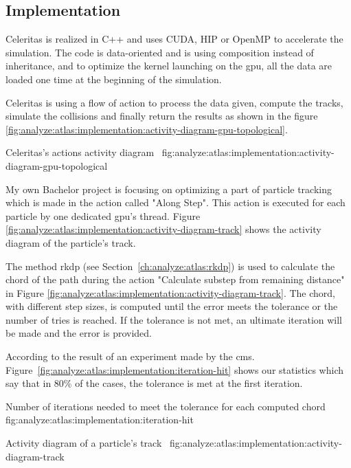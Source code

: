 \subsection{Implementation}
\label{ch:analyze:atlas:implementation}

Celeritas is realized in C++ and uses CUDA, HIP or OpenMP to accelerate the
simulation.
The code is data-oriented and is using composition instead of inheritance, and
to optimize the kernel launching on the \acrshort{gpu}, all the data are loaded
one time at the beginning of the simulation.

Celeritas is using a flow of action to process the data given, compute the
tracks, simulate the collisions and finally return the results as shown in the
figure \ref{fig:analyze:atlas:implementation:activity-diagram-gpu-topological}.

{Celeritas's actions activity diagram~\cite{chep2023-presentation-johnson}}
{fig:analyze:atlas:implementation:activity-diagram-gpu-topological}

My own Bachelor project is focusing on optimizing a part of particle tracking which is
made in the action called "Along Step".
This action is executed for each particle by one dedicated \acrshort{gpu}'s
thread.
Figure \ref{fig:analyze:atlas:implementation:activity-diagram-track} shows
the activity diagram of the particle's track.

The method \acrshort{rkdp} (see Section~\ref{ch:analyze:atlas:rkdp}) is used to calculate the
chord of the path during the action "Calculate substep from remaining distance"
in Figure \ref{fig:analyze:atlas:implementation:activity-diagram-track}.
The chord, with different step sizes, is computed until the error meets the
tolerance or the number of tries is reached.
If the tolerance is not met, an ultimate iteration will be made and the error
is provided.

According to the result of an experiment made by the \acrfull{cms}.
Figure~\ref{fig:analyze:atlas:implementation:iteration-hit} shows our statistics
which say that in 80\% of the cases, the tolerance is met at the first
iteration.

{Number of iterations needed to meet the tolerance for each computed chord}
{fig:analyze:atlas:implementation:iteration-hit}

{Activity diagram of a particle's track~\cite{atlas-week-esseiva}}
{fig:analyze:atlas:implementation:activity-diagram-track}

